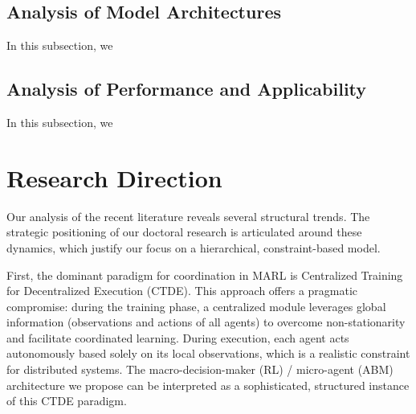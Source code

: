 \documentclass[conference]{IEEEtran}
\begin{document}
\subsection{Analysis of Model Architectures}
In this subsection, we 

\subsection{Analysis of Performance and Applicability}
In this subsection, we 

\section{Research Direction}

Our analysis of the recent literature reveals several structural trends. The strategic positioning of our doctoral research is articulated around these dynamics, which justify our focus on a hierarchical, constraint-based model.

First, the dominant paradigm for coordination in MARL is Centralized Training for Decentralized Execution (CTDE). This approach offers a pragmatic compromise: during the training phase, a centralized module leverages global information (observations and actions of all agents) to overcome non-stationarity and facilitate coordinated learning. During execution, each agent acts autonomously based solely on its local observations, which is a realistic constraint for distributed systems. The macro-decision-maker (RL) / micro-agent (ABM) architecture we propose can be interpreted as a sophisticated, structured instance of this CTDE paradigm.
\end{document}
